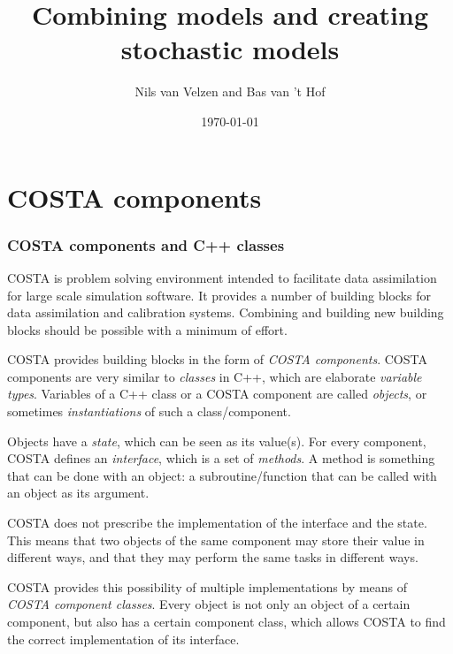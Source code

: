 \documentclass[a4paper,12pt]{article}
\title{Combining models and creating stochastic models}
\author{Nils van Velzen and Bas van 't Hof}
\date{\today}
\begin{document}
\memotitlepage

\begin{vtlogsheet}
\end{vtlogsheet}

\tableofcontents

\part{COSTA components}
\section{COSTA components and C++ classes}
COSTA is problem solving environment intended to facilitate data
assimilation for large scale simulation software. It provides a number of
building blocks for data assimilation and calibration systems.  Combining
and building new building blocks should be possible with a minimum of
effort.

COSTA provides building blocks in the form of {\em COSTA components}.
COSTA components are very similar to {\em classes} in C++, which are
elaborate {\em variable types}. Variables of a C++ class or a COSTA
component are called {\em objects}, or sometimes {\em instantiations} of
such a class/component.

Objects have a {\em state}, which can be seen as its value(s).  For every
component, COSTA defines an {\em interface}, which is a set of {\em
methods}. A method is something that can be done with an object: a 
subroutine/function that can be called with an object as its argument.

COSTA does not prescribe the implementation of the interface and the state. 
This means that two objects of the same component may store their value in 
different ways, and that they may perform the same tasks in different ways. 

COSTA provides this possibility of multiple implementations by means of 
{\em COSTA component classes}. Every object is not only an object of a
certain component, but also has a certain component class, which allows 
COSTA to find the correct implementation of its interface.


\end{document}
